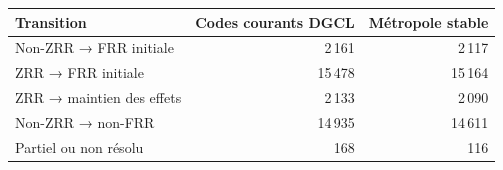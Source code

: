 \begin{tabularx}{\linewidth}{Xrr}
\toprule
Transition & Codes courants DGCL & Métropole stable \\
\midrule
Non-ZRR → FRR initiale & 2\,161 & 2\,117 \\
ZRR → FRR initiale & 15\,478 & 15\,164 \\
ZRR → maintien des effets & 2\,133 & 2\,090 \\
Non-ZRR → non-FRR & 14\,935 & 14\,611 \\
Partiel ou non résolu & 168 & 116 \\
\bottomrule
\end{tabularx}
